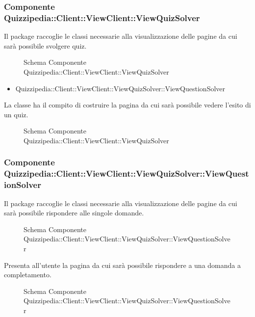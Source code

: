\subsubsection{Componente Quizzipedia::Client::ViewClient::ViewQuizSolver}
Il package raccoglie le classi necessarie alla visualizzazione delle pagine da cui sarà possibile svolgere quiz.
\begin{figure}[H]
\centering
\noindent{}
\caption{Schema Componente Quizzipedia::Client::ViewClient::ViewQuizSolver}
\end{figure}
\begin{itemize}
\item Quizzipedia::Client::ViewClient::ViewQuizSolver::ViewQuestionSolver
\end{itemize}
La classe ha il compito di costruire la pagina da cui sarà possibile vedere l'esito di un quiz.
\begin{figure}[H]
\centering
\noindent{}
\caption{Schema Componente Quizzipedia::Client::ViewClient::ViewQuizSolver}
\end{figure}
\subsubsection{Componente Quizzipedia::Client::ViewClient::ViewQuizSolver::ViewQuestionSolver}
Il package raccoglie le classi necessarie alla visualizzazione delle pagine da cui sarà possibile rispondere alle singole domande.
\begin{figure}[H]
\centering
\noindent{}
\caption{Schema Componente Quizzipedia::Client::ViewClient::ViewQuizSolver::ViewQuestionSolver}
\end{figure}
Presenta all'utente la pagina da cui sarà possibile rispondere a una domanda a completamento.
\begin{figure}[H]
\centering
\noindent{}
\caption{Schema Componente Quizzipedia::Client::ViewClient::ViewQuizSolver::ViewQuestionSolver}
\end{figure}

